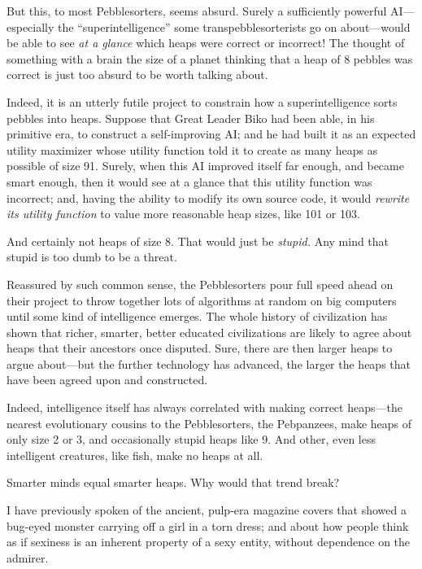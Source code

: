 {
 But this, to most Pebblesorters, seems absurd. Surely a
sufficiently powerful AI---especially the
``superintelligence'' some
transpebblesorterists go on about---would be able to see \textit{at a
glance} which heaps were correct or incorrect! The thought of something
with a brain the size of a planet thinking that a heap of 8 pebbles was
correct is just too absurd to be worth talking about.}

{
 Indeed, it is an utterly futile project to constrain how a
superintelligence sorts pebbles into heaps. Suppose that Great Leader
Biko had been able, in his primitive era, to construct a self-improving
AI; and he had built it as an expected utility maximizer whose utility
function told it to create as many heaps as possible of size 91.
Surely, when this AI improved itself far enough, and became smart
enough, then it would see at a glance that this utility function was
incorrect; and, having the ability to modify its own source code, it
would \textit{rewrite its utility function} to value more reasonable
heap sizes, like 101 or 103.}

{
 And certainly not heaps of size 8. That would just be
\textit{stupid.} Any mind that stupid is too dumb to be a threat.}

{
 Reassured by such common sense, the Pebblesorters pour full speed
ahead on their project to throw together lots of algorithms at random
on big computers until some kind of intelligence emerges. The whole
history of civilization has shown that richer, smarter, better educated
civilizations are likely to agree about heaps that their ancestors once
disputed. Sure, there are then larger heaps to argue about---but the
further technology has advanced, the larger the heaps that have been
agreed upon and constructed.}

{
 Indeed, intelligence itself has always correlated with making
correct heaps---the nearest evolutionary cousins to the Pebblesorters,
the Pebpanzees, make heaps of only size 2 or 3, and occasionally stupid
heaps like 9. And other, even less intelligent creatures, like fish,
make no heaps at all.}

{
 Smarter minds equal smarter heaps. Why would that trend break?}

\myendsectiontext


{
 I have previously spoken of the ancient, pulp-era magazine covers
that showed a bug-eyed monster carrying off a girl in a torn dress; and
about how people think as if sexiness is an inherent property of a sexy
entity, without dependence on the admirer. }

